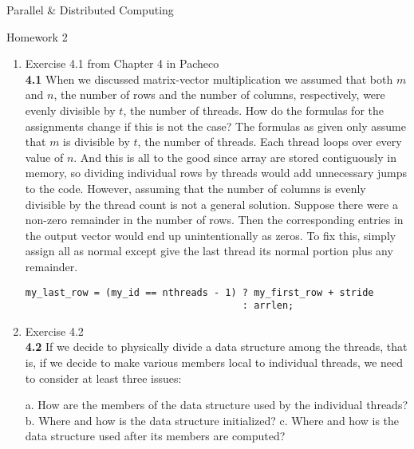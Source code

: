 \documentclass[11pt,epsfig,letterpaper]{article}
\begin{document}

    \vspace{5pc}
    \centerline{\huge Parallel \& Distributed Computing}
    \vspace{0.5pc}
    \centerline{\huge Homework 2}
    \vspace{3pc}


    \begin{enumerate}

            \item Exercise 4.1 from Chapter 4 in Pacheco \\
            {\bf 4.1} \>\> When we discussed matrix-vector multiplication we assumed that both $m$ and $n$, the number of rows and the number of columns, respectively, were evenly divisible by $t$, the number of threads. How do the formulas for the assignments change if this is not the case?
            \vspace{0.5pc}
            \quad The formulas as given only assume that $m$ is divisible by $t$, the number of threads. Each thread loops over every value of $n$. And this is all to the good since array are stored contiguously in memory, so dividing individual rows by threads would add unnecessary jumps to the code.
            \quad However, assuming that the number of columns is evenly divisible by the thread count is not a general solution. Suppose there were a non-zero remainder in the number of rows. Then the corresponding entries in the output vector would end up unintentionally as zeros.
            \quad To fix this, simply assign all as normal except give the last thread its normal portion plus any remainder.
            \begin{verbatim}
my_last_row = (my_id == nthreads - 1) ? my_first_row + stride
                                      : arrlen;
            \end{verbatim}


            \item Exercise 4.2 \\
            {\bf 4.2}\>\> If we decide to physically divide a data structure among the threads, that is, if we decide to make various members local to individual threads, we need to consider at least three issues:
            \begin{enumerate}
            a. How are the members of the data structure used by the individual threads?
            b. Where and how is the data structure initialized?
            c. Where and how is the data structure used after its members are computed?
            \end{enumerate}


\end{enumerate}
\end{document}
